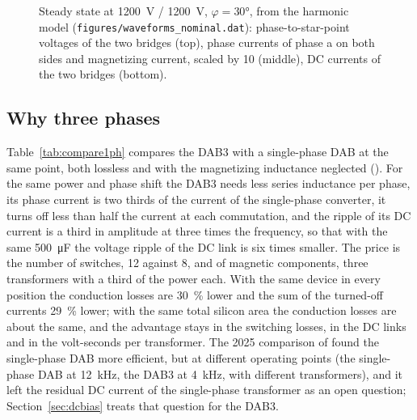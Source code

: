 \documentclass[12pt,a4paper]{scrartcl}
\newcommand{\ped}[1]{_{\mathrm{#1}}}
\newcommand{\code}[1]{\texttt{#1}}
\begin{document}
\begin{onehalfspace}
\begin{figure}[H]
	\captionsetup{width=0.85\textwidth, font=small}
	\caption[Waveforms at the nominal point.]{Steady state at \SI{1200}{\volt} / \SI{1200}{\volt}, $\varphi = \ang{30}$, from the harmonic model (\code{figures/waveforms\_nominal.dat}): phase-to-star-point voltages of the two bridges (top), phase currents of phase a on both sides and magnetizing current, scaled by 10 (middle), DC currents of the two bridges (bottom).}
	\label{fig:waveforms}
\end{figure}

\subsection{Why three phases}
\label{sec:why3ph}

Table~\ref{tab:compare1ph} compares the DAB3 with a single-phase DAB \cite{krismer2010, zhao2014} at the same point, both lossless and with the magnetizing inductance neglected (). For the same power and phase shift the DAB3 needs less series inductance per phase, its phase current is two thirds of the current of the single-phase converter, it turns off less than half the current at each commutation, and the ripple of its DC current is a third in amplitude at three times the frequency, so that with the same \SI{500}{\micro\farad} the voltage ripple of the DC link is six times smaller. The price is the number of switches, 12 against 8, and of magnetic components, three transformers with a third of the power each. With the same device in every position the conduction losses are \SI{30}{\percent} lower and the sum of the turned-off currents \SI{29}{\percent} lower; with the same total silicon area the conduction losses are about the same, and the advantage stays in the switching losses, in the DC links and in the volt-seconds per transformer. The 2025 comparison of \cite{sst_doc} found the single-phase DAB more efficient, but at different operating points (the single-phase DAB at \SI{12}{\kilo\hertz}, the DAB3 at \SI{4}{\kilo\hertz}, with different transformers), and it left the residual DC current of the single-phase transformer as an open question; Section~\ref{sec:dcbias} treats that question for the DAB3.


\end{onehalfspace}
\end{document}
